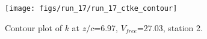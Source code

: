 \begin{figure}[H]
\centering
\texttt{[image: figs/run\_17/run\_17\_ctke\_contour]}
\caption{Contour plot of $k$ at $z/c$=6.97, $V_{free}$=27.03, station 2.}
\label{fig:run_17_ctke_contour}
\end{figure}


